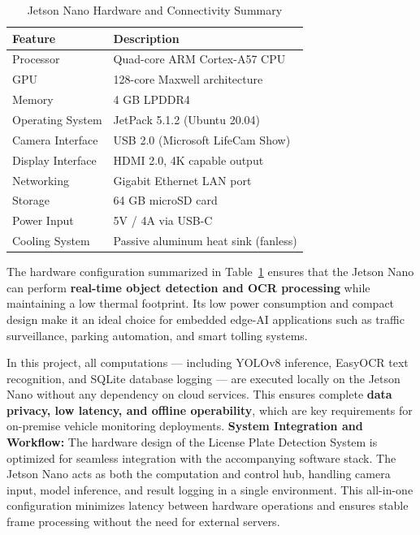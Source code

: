 \begin{table}[h!]
	\centering
	\caption{Jetson Nano Hardware and Connectivity Summary}
	\label{tab:jetson_summary}
	\renewcommand{\arraystretch}{1.3} %
	\begin{tabular}{|l|l|}
		\hline
		\textbf{Feature} & \textbf{Description} \\
		\hline
		Processor & Quad-core ARM Cortex-A57 CPU \\
		\hline
		GPU & 128-core Maxwell architecture \\
		\hline
		Memory & 4 GB LPDDR4 \\
		\hline
		Operating System & JetPack 5.1.2 (Ubuntu 20.04) \\
		\hline
		Camera Interface & USB 2.0 (Microsoft LifeCam Show) \\
		\hline
		Display Interface & HDMI 2.0, 4K capable output \\
		\hline
		Networking & Gigabit Ethernet LAN port \\
		\hline
		Storage & 64 GB microSD card \\
		\hline
		Power Input & 5V / 4A via USB-C \\
		\hline
		Cooling System & Passive aluminum heat sink (fanless) \\
		\hline
	\end{tabular}
\end{table}

\vspace{0.3cm}
\noindent
The hardware configuration summarized in Table~\ref{tab:jetson_summary} ensures that the Jetson Nano can perform \textbf{real-time object detection and OCR processing} while maintaining a low thermal footprint.  
Its low power consumption and compact design make it an ideal choice for embedded edge-AI applications such as traffic surveillance, parking automation, and smart tolling systems.

\noindent
In this project, all computations — including YOLOv8 inference, EasyOCR text recognition, and SQLite database logging — are executed locally on the Jetson Nano without any dependency on cloud services.  
This ensures complete \textbf{data privacy, low latency, and offline operability}, which are key requirements for on-premise vehicle monitoring deployments.
\vspace{0.4cm}
\noindent
\textbf{System Integration and Workflow:}  
The hardware design of the License Plate Detection System is optimized for seamless integration with the accompanying software stack.  
The Jetson Nano acts as both the computation and control hub, handling camera input, model inference, and result logging in a single environment.  
This all-in-one configuration minimizes latency between hardware operations and ensures stable frame processing without the need for external servers.

